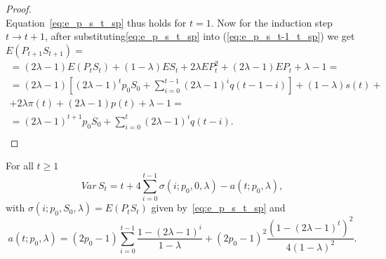 \documentclass[runningheads]{CMSIM}
\begin{document}
\begin{proof}
\[        \]
        Equation~\eqref{eq:e_p_s_t_sp} thus holds for $t=1$.
        Now for the
        induction step $t\rightarrow t+1$, after substituting\eqref{eq:e_p_s_t_sp}
        into (\ref{eq:e_p_s_t-1_t_sp}) we get $E(P_{t+1}S_{t+1})=$
        \begin{gather*}
            =(2\lambda-1)E(P_{t}S_{t})+(1-\lambda)ES_{t}+2\lambda EP_{t}^{2}+(2\lambda-1)EP_{t}+\lambda-1=\\
            =(2\lambda-1)[(2\lambda-1)^{t}p_{0}S_{0}+\sum_{i=0}^{t-1}(2\lambda-1)^{i}q(t-1-i)]+(1-\lambda)s(t)+\\
            +2\lambda\pi(t)+(2\lambda-1)p(t)+\lambda-1=\\
            =(2\lambda-1)^{t+1}p_{0}S_{0}+\sum_{i=0}^{t}(2\lambda-1)^{i}q(t-i).\\
        \end{gather*}
    \end{proof}
    \begin{theorem}
        \label{thm:VarSt_sp}For all $t\ge1$
        \[
            Var\,S_{t}=t+4\sum_{i=0}^{t-1}\sigma(i;p_{0},0,\lambda)-a(t;p_{0},\lambda),
        \]
        with $\sigma(i;p_{0},S_{0},\lambda)=E(P_{t}S_{t})$ given by~\eqref{eq:e_p_s_t_sp}
        and
        \[
            a(t;p_{0},\lambda)=(2p_{0}-1)\sum_{i=0}^{t-1}\frac{1-(2\lambda-1)^{i}}{1-\lambda}+(2p_{0}-1)^{2}\frac{(1-(2\lambda-1)^{t})^{2}}{4(1-\lambda)^{2}}.
        \]
    \end{theorem}
\end{document}
